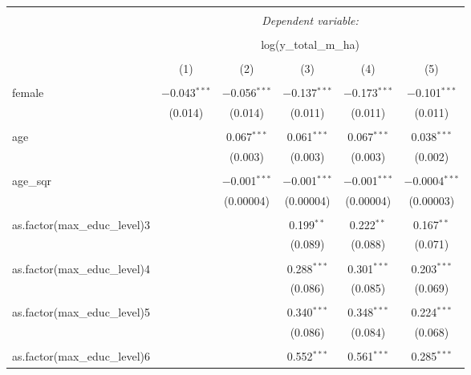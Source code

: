 
\begin{table}[!htbp] \centering 
  \caption{} 
  \label{} 
\begin{tabular}{@{\extracolsep{5pt}}lccccc} 
\\[-1.8ex]\hline 
\hline \\[-1.8ex] 
 & \multicolumn{5}{c}{\textit{Dependent variable:}} \\ 
\cline{2-6} 
\\[-1.8ex] & \multicolumn{5}{c}{log(y\_total\_m\_ha)} \\ 
\\[-1.8ex] & (1) & (2) & (3) & (4) & (5)\\ 
\hline \\[-1.8ex] 
 female & $-$0.043$^{***}$ & $-$0.056$^{***}$ & $-$0.137$^{***}$ & $-$0.173$^{***}$ & $-$0.101$^{***}$ \\ 
  & (0.014) & (0.014) & (0.011) & (0.011) & (0.011) \\ 
  & & & & & \\ 
 age &  & 0.067$^{***}$ & 0.061$^{***}$ & 0.067$^{***}$ & 0.038$^{***}$ \\ 
  &  & (0.003) & (0.003) & (0.003) & (0.002) \\ 
  & & & & & \\ 
 age\_sqr &  & $-$0.001$^{***}$ & $-$0.001$^{***}$ & $-$0.001$^{***}$ & $-$0.0004$^{***}$ \\ 
  &  & (0.00004) & (0.00004) & (0.00004) & (0.00003) \\ 
  & & & & & \\ 
 as.factor(max\_educ\_level)3 &  &  & 0.199$^{**}$ & 0.222$^{**}$ & 0.167$^{**}$ \\ 
  &  &  & (0.089) & (0.088) & (0.071) \\ 
  & & & & & \\ 
 as.factor(max\_educ\_level)4 &  &  & 0.288$^{***}$ & 0.301$^{***}$ & 0.203$^{***}$ \\ 
  &  &  & (0.086) & (0.085) & (0.069) \\ 
  & & & & & \\ 
 as.factor(max\_educ\_level)5 &  &  & 0.340$^{***}$ & 0.348$^{***}$ & 0.224$^{***}$ \\ 
  &  &  & (0.086) & (0.084) & (0.068) \\ 
  & & & & & \\ 
 as.factor(max\_educ\_level)6 &  &  & 0.552$^{***}$ & 0.561$^{***}$ & 0.285$^{***}$ \\ 

\end{tabular}
\end{table}
